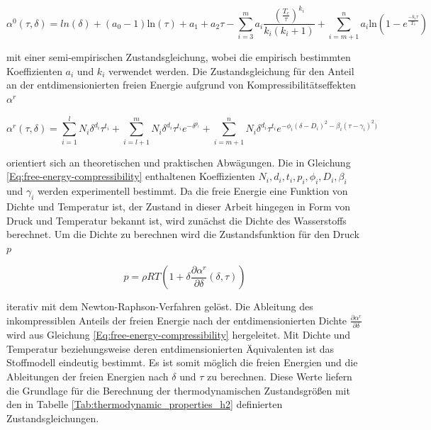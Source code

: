 \begin{equation}\label{Eq:free-energy-idealgas}
	\alpha^0(\tau,\delta)=ln(\delta)+(a_0-1)\mathrm{ln}(\tau)+a_1+a_2\tau-\sum_{i=3}^{m}a_i\frac{(\frac{T_c}{\tau})^{k_i}}{k_i(k_i+1)}+\sum_{i=m+1}^{n}a_i\mathrm{ln}\left(1-e^{\frac{-k_i\tau}{T_c}}\right) \,
\end{equation}

mit einer semi-empirischen Zustandsgleichung, wobei die empirisch bestimmten Koeffizienten $a_i$ und $k_i$ verwendet werden. Die Zustandsgleichung für den Anteil an der entdimensionierten freien Energie aufgrund von Kompressibilitätseffekten $\alpha^r$

\begin{equation}\label{Eq:free-energy-compressibility}
	\alpha^r(\tau,\delta)=\sum_{i=1}^{l}N_i\delta^{d_i}\tau^{t_i}+\sum_{i=l+1}^{m}N_i\delta^{d_i}\tau^{t_i}e^{-\delta^{p_i}}+\sum_{i=m+1}^{n}N_i\delta^{d_i}\tau^{t_i}e^{-\phi_i(\delta-D_i)^2-\beta_i(\tau-\gamma_i)^2)}
\end{equation}

orientiert sich an theoretischen und praktischen Abwägungen. Die in Gleichung \ref{Eq:free-energy-compressibility} enthaltenen Koeffizienten $N_i, d_i, t_i, p_i, \phi_i, D_i, \beta_i$ und $\gamma_i$ werden experimentell bestimmt. Da die freie Energie eine Funktion von Dichte und Temperatur ist, der Zustand in dieser Arbeit hingegen in Form von Druck und Temperatur bekannt ist, wird zunächst die Dichte des Wasserstoffs berechnet. Um die Dichte zu berechnen wird die Zustandsfunktion für den Druck $p$

\begin{equation}\label{Eq:pressure-guess}
	p=\rho RT\left(1+\delta\frac{\partial\alpha^r}{\partial\delta}(\delta, \tau)\right)
\end{equation}

iterativ mit dem Newton-Raphson-Verfahren gelöst. Die Ableitung des inkompressiblen Anteils der freien Energie nach der entdimensionierten Dichte $\frac{\partial\alpha^r}{\partial\delta}$ wird aus Gleichung \ref{Eq:free-energy-compressibility} hergeleitet. Mit Dichte und Temperatur beziehungsweise deren entdimensionierten Äquivalenten ist das Stoffmodell eindeutig bestimmt. Es ist somit möglich die freien Energien und die Ableitungen der freien Energien nach $\delta$ und $\tau$ zu berechnen. Diese Werte liefern die Grundlage für die Berechnung der thermodynamischen Zustandsgrößen mit den in Tabelle \ref{Tab:thermodynamic_properties_h2} definierten Zustandsgleichungen.

